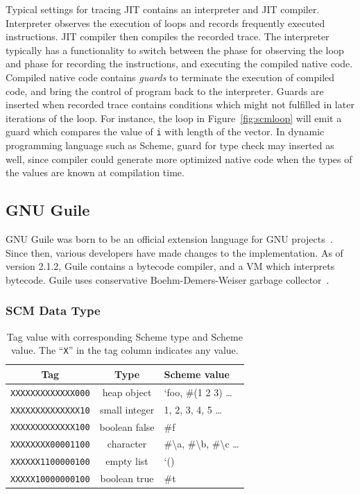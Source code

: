 \documentclass[preprint]{sigplanconf}
\begin{document}
Typical settings for tracing JIT contains an interpreter and JIT
compiler. Interpreter observes the execution of loops and records frequently
executed instructions. JIT compiler then compiles the recorded trace. The
interpreter typically has a functionality to switch between the phase for
observing the loop and phase for recording the instructions, and executing the
compiled native code.  Compiled native code contains \textit{guards} to
terminate the execution of compiled code, and bring the control of program
back to the interpreter. Guards are inserted when recorded trace contains
conditions which might not fulfilled in later iterations of the loop. For
instance, the loop in Figure~\hyperref[fig:scmloop]{\ref{fig:scmloop}} will
emit a guard which compares the value of \texttt{i} with length of the
vector. In dynamic programming language such as Scheme, guard for type check
may inserted as well, since compiler could generate more optimized native code
when the types of the values are known at compilation time.

\subsection{GNU Guile}

GNU Guile was born to be an official extension language for GNU
projects~\cite{Galassi02guilereference}. Since then, various developers have
made changes to the implementation. As of version 2.1.2, Guile contains a
bytecode compiler, and a VM which interprets bytecode. Guile uses conservative
Boehm-Demers-Weiser garbage collector~\cite{boehm1988garbage}.


\subsubsection{SCM Data Type}

\begin{table}
  \begin{center}
  \begin{tabular}{ccl}
    \toprule
    Tag&Type&Scheme value\\
    \midrule
    \texttt{XXXXXXXXXXXXX000} & heap object & `foo, \#(1 2 3) \ldots \\
    \texttt{XXXXXXXXXXXXXX10} & small integer & 1, 2, 3, 4, 5 \ldots \\
    \texttt{XXXXXXXXXXXXX100} & boolean false & \#f \\
    \texttt{XXXXXXXX00001100} & character & \#\textbackslash a, \#\textbackslash b,
    \#\textbackslash c \ldots \\ %
    \texttt{XXXXXX1100000100} & empty list & `() \\ %
    \texttt{XXXXX10000000100} & boolean true & \#t \\
    \bottomrule
  \end{tabular}
  \end{center}
  \caption{Tag value with corresponding Scheme type and Scheme value. The
    ``\texttt{X}'' in the tag column indicates any value.}
\label{tab:tags}
\end{table}
\end{document}
